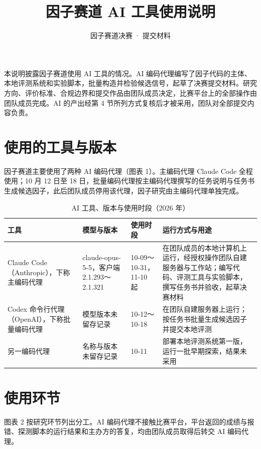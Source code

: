 \documentclass[UTF8,a4paper,zihao=-4,fontset=none]{ctexart}
\title{因子赛道 AI 工具使用说明}
\subtitle{因子赛道决赛 · 提交材料}
\newcommand{\tablesetup}{\small\linespread{1.05}\selectfont\renewcommand{\arraystretch}{1.18}}
\begin{document}
\makereporttitle

本说明披露因子赛道使用 AI 工具的情况。AI 编码代理编写了因子代码的主体、本地评测系统和实验脚本，批量构造并检验候选信号，起草了决赛提交材料。研究方向、评价标准、合规边界和提交作品由团队成员决定，比赛平台上的全部操作由团队成员完成。AI 的产出经第 4 节所列方式复核后才被采用，团队对全部提交内容负责。

\section{使用的工具与版本}

因子赛道主要使用了两种 AI 编码代理（图表 1）。主编码代理 Claude Code 全程使用；10 月 12 日至 18 日，批量编码代理按主编码代理撰写的任务说明与任务书生成候选因子，此后团队成员停用该代理，因子研究由主编码代理单独完成。

\begin{table}[!htbp]
\caption{AI 工具、版本与使用时段（2026 年）}
\centering
{\tablesetup
\begin{tabularx}{\textwidth}{@{}P{3.3cm}P{3.6cm}P{2.3cm}L@{}}
\toprule
工具 & 模型与版本 & 使用时段 & 运行方式与用途\\
\midrule
Claude Code（Anthropic），下称主编码代理 & claude-opus-5-5，客户端 2.1.293～2.1.321 & 10-09～10-31，11-10 起 & 在团队成员的本地计算机上运行，经授权操作团队自建服务器与工作站；编写代码、评测工具与实验脚本，撰写任务书并验收，起草决赛材料\\
Codex 命令行代理（OpenAI），下称批量编码代理 & 模型版本未留存记录 & 10-12～10-18 & 在团队自建服务器上运行；按任务书批量生成候选因子并提交本地评测\\
另一编码代理 & 名称与版本未留存记录 & 10-11 & 部署本地评测系统第一版，运行一批早期探索，结果未采用\\
\bottomrule
\end{tabularx}}
\end{table}

\section{使用环节}

图表 2 按研究环节列出分工。AI 编码代理不接触比赛平台，平台返回的成绩与报错、探测脚本的运行结果和主办方的答复，均由团队成员取得后转交 AI 编码代理。
\end{document}

